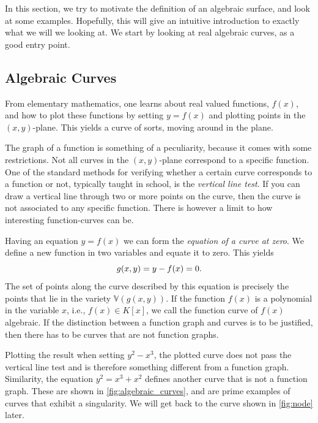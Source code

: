 \documentclass{article}
\newcommand{\V}{\ensuremath{\mathbb{V}}}
\begin{document}
    In this section, we try to motivate the definition of an algebraic surface,
    and look at some examples. Hopefully, this will give an intuitive
    introduction to exactly what we will we looking at. We start by looking at
    real algebraic curves, as a good entry point.

    \subsection{Algebraic Curves}
    \label{sub:algebraic_curves}
    
    From elementary mathematics, one learns about real valued functions,
    $f(x)$, and how to plot these functions by setting $y = f(x)$ and plotting
    points in the $(x, y)$-plane. This yields a curve of sorts, moving around
    in the plane.

    The graph of a function is something of a peculiarity, because it comes
    with some restrictions. Not all curves in the $(x, y)$-plane correspond to
    a specific function. One of the standard methods for verifying whether a
    certain curve corresponds to a function or not, typically taught in school,
    is the \emph{vertical line test}. If you can draw a vertical line through
    two or more points on the curve, then the curve is not associated to any
    specific function. There is however a limit to how interesting
    function-curves can be.

    Having an equation $y = f(x)$ we can form the \emph{equation of a curve at
    zero}. We define a new function in two variables and equate it to zero.
    This yields
    \begin{equation}
        \notag
        g(x, y) = y - f(x) = 0.
    \end{equation}
    The set of points along the curve described by this equation is precisely
    the points that lie in the variety $\V(g(x, y))$.
    If the function $f(x)$ is a polynomial in the variable $x$, i.e., $f(x) \in
    K[x]$, we call the function curve of $f(x)$ algebraic. If the distinction
    between a function graph and curves is to be justified, then there has to
    be curves that are not function graphs.

    Plotting the result when setting $y^2 - x^3$, the plotted curve does not
    pass the vertical line test and is therefore something different from a
    function graph. Similarity, the equation $y^2 = x^3 + x^2$ defines another
    curve that is not a function graph. These are shown in
    \cref{fig:algebraic_curves}, and are prime examples of curves that exhibit
    a singularity. We will get back to the curve shown in \cref{fig:node}
    later.
\end{document}
